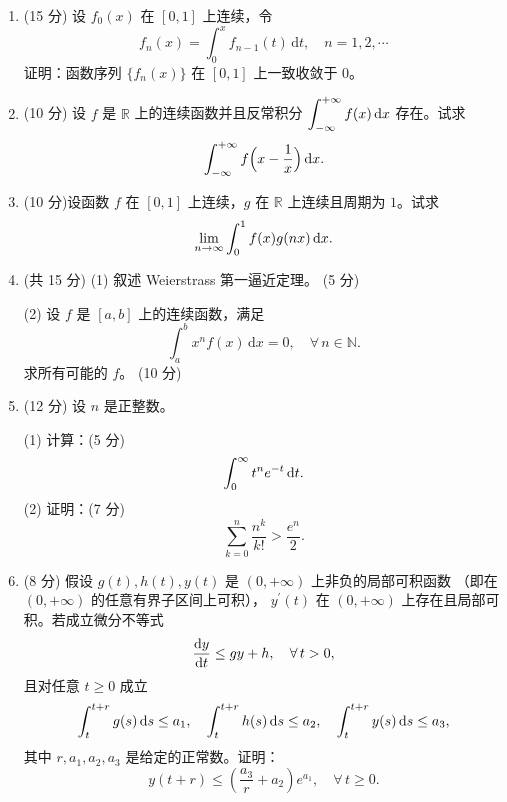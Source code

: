 \begin{enumerate}
\item (15 分) 设 $f_{0}(x)$ 在 $[0,1]$ 上连续，令
$$f_{n}(x)=\int_{0}^{x} f_{n-1}(t) \, \mathrm{d} t, \quad n=1,2,\cdots$$
证明：函数序列 $\{f_{n}(x)\}$ 在 $[0,1]$ 上一致收敛于 $0$。
\item (10 分) 设 $f$ 是 $\mathbb{R}$ 上的连续函数并且反常积分 $\displaystyle\int_{-\infty}^{+\infty} f(x) \,{\rm d} x$ 存在。试求
$$\int_{-\infty}^{+\infty} f\Big(x-\frac{1}{x}\Big) \,{\rm d} x.$$
\item (10 分)设函数 $f$ 在 $[0,1]$ 上连续，$g$ 在 $\mathbb{R}$ 上连续且周期为 $1$。试求
$$\lim_{n \rightarrow \infty} \int_{0}^{1} f(x) g(nx) \,{\rm d} x.$$
\item (共 15 分) (1) 叙述 Weierstrass 第一逼近定理。 (5 分)

(2) 设 $f$ 是 $[a,b]$ 上的连续函数，满足
$$\int_{a}^{b} x^{n} f(x) \,\mathrm{d} x=0, \quad \forall\, n \in \mathbb{N}.$$
求所有可能的 $f$。 (10 分)
\item (12 分) 设 $n$ 是正整数。

(1) 计算：(5 分)
$$\int_{0}^{\infty} t^{n} e^{-t} \,{\rm d} t.$$
(2) 证明：(7 分)
$$\sum_{k=0}^{n} \frac{n^{k}}{k!}>\frac{e^{n}}{2}.$$
\item (8 分) 假设 $g(t), h(t), y(t)$ 是 $(0,+\infty)$ 上非负的局部可积函数
（即在 $(0,+\infty)$ 的任意有界子区间上可积），
$y^{\prime}(t)$ 在 $(0,+\infty)$ 上存在且局部可积。若成立微分不等式
$$\frac{{\rm d} y}{{\rm d} t} \leq g y+h, \quad \forall\, t>0,$$
且对任意 $t \geq 0$ 成立
$$\int_{t}^{t+r} g(s) \,{\rm d} s \leq a_{1}, 
\quad \int_{t}^{t+r} h(s) \,{\rm d} s \leq a_{2}, 
\quad \int_{t}^{t+r} y(s) \,{\rm d} s \leq a_{3},$$
其中 $r, a_{1}, a_{2}, a_{3}$ 是给定的正常数。证明：
$$y(t+r) \leq \left(\frac{a_{3}}{r}+a_{2}\right) e^{a_{1}}, \quad \forall\, t \geq 0.$$
\end{enumerate}

